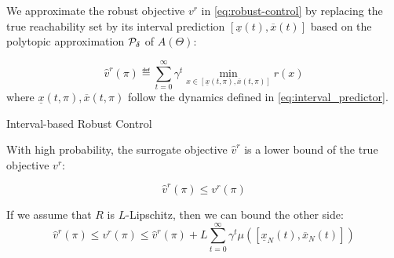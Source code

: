 \documentclass{article}
\begin{document}
\begin{definition}
We approximate the robust objective $v^r$ in \eqref{eq:robust-control} by replacing the true reachability set by its interval prediction $[\underline{x}(t), \overline{x}(t)]$ based on the polytopic approximation $\mathcal{P}_\delta$ of $A(\Theta)$: 

\begin{equation}
\hat{v}^r(\pi) \eqdef \sum_{t=0}^\infty \gamma^t \min_{x\in[\underline{x}(t, \pi), \overline{x}(t, \pi)]}  r(x)
\end{equation}
where $\underline{x}(t, \pi), \overline{x}(t, \pi)$ follow the dynamics defined in \eqref{eq:interval_predictor}.
\end{definition}

\begin{algorithm}[tp]
  \SetAlgoLined\DontPrintSemicolon
  \setcounter{AlgoLine}{0}
\caption{Interval-based Robust Control}
\label{algo:irc}

\end{algorithm}

\begin{property}
\label{prop:lower-bound}
With high probability, the surrogate objective $\hat{v}^r$ is a lower bound of the true objective $v^r$:

\begin{equation}
\hat{v}^r(\pi) \leq v^r(\pi)
\end{equation}

If we assume that $R$ is $L$-Lipschitz, then we can bound the other side:
\begin{equation*}
     \hat{v}^r(\pi) \leq v^r(\pi) \leq \hat{v}^r(\pi) + L\sum_{t=0}^\infty \gamma^t \mu([\underline{x}_N(t),\overline{x}_N(t)])
\end{equation*}
\end{property}
\end{document}
